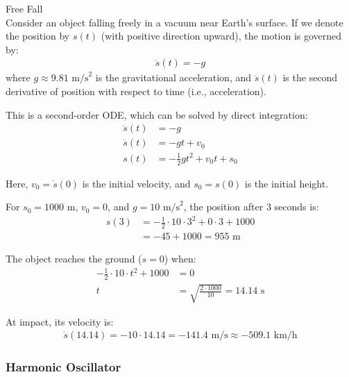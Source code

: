 \begin{example2}{Free Fall}\\
Consider an object falling freely in a vacuum near Earth's surface. If we denote the position by $s(t)$ (with positive direction upward), the motion is governed by:
\begin{align*}
\ddot{s}(t) = -g
\end{align*}
where $g \approx 9.81 \text{ m/s}^2$ is the gravitational acceleration, and $\ddot{s}(t)$ is the second derivative of position with respect to time (i.e., acceleration).

This is a second-order ODE, which can be solved by direct integration:
\begin{align*}
\ddot{s}(t) &= -g\\
\dot{s}(t) &= -gt + v_0\\
s(t) &= -\frac{1}{2}gt^2 + v_0t + s_0
\end{align*}

Here, $v_0 = \dot{s}(0)$ is the initial velocity, and $s_0 = s(0)$ is the initial height.

For $s_0 = 1000 \text{ m}$, $v_0 = 0$, and $g = 10 \text{ m/s}^2$, the position after 3 seconds is:
\begin{align*}
s(3) &= -\frac{1}{2} \cdot 10 \cdot 3^2 + 0 \cdot 3 + 1000\\
&= -45 + 1000 = 955 \text{ m}
\end{align*}

The object reaches the ground ($s = 0$) when:
\begin{align*}
-\frac{1}{2} \cdot 10 \cdot t^2 + 1000 &= 0\\
t &= \sqrt{\frac{2 \cdot 1000}{10}} = 14.14 \text{ s}
\end{align*}

At impact, its velocity is:
\begin{align*}
\dot{s}(14.14) = -10 \cdot 14.14 = -141.4 \text{ m/s} \approx -509.1 \text{ km/h}
\end{align*}
\end{example2}

\subsubsection{Harmonic Oscillator}


